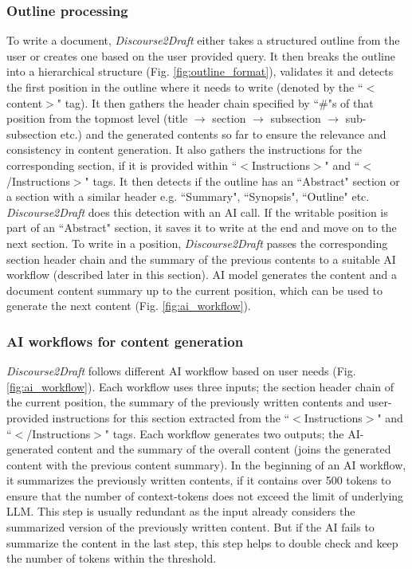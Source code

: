 \documentclass[utf8]{FrontiersinHarvard} %
\newcommand{\appname}{\emph{Discourse2Draft}}
\newcommand{\maxTokensSummarization}{500}
\begin{document}
\subsubsection{Outline processing}
To write a document, \appname{} either takes a structured outline from the user or creates one based on the user provided query. It then breaks the outline into a hierarchical structure (Fig. \ref{fig:outline_format}), validates it and detects the first position in the outline where it needs to write (denoted by the ``$<$content$>$" tag). It then gathers the header chain specified by ``\#"s of that position from the topmost level (title $\rightarrow$ section $\rightarrow$ subsection $\rightarrow$ sub-subsection etc.) and the generated contents so far to ensure the relevance and consistency in content generation. It also gathers the instructions for the corresponding section, if it is provided within ``$<$Instructions$>$" and ``$<$/Instructions$>$" tags. It then detects if the outline has an ``Abstract" section or a section with a similar header e.g. ``Summary", ``Synopsis", ``Outline" etc. \appname{} does this detection with an AI call. If the writable position is part of an ``Abstract" section, it saves it to write at the end and move on to the next section. To write in a position, \appname{} passes the corresponding section header chain and the summary of the previous contents to a suitable AI workflow (described later in this section). AI model generates the content and a document content summary up to the current position, which can be used to generate the next content (Fig. \ref{fig:ai_workflow}).

\subsubsection{AI workflows for content generation}

\appname{} follows different AI workflow based on user needs (Fig. \ref{fig:ai_workflow}). Each workflow uses three inputs; the section header chain of the current position, the summary of the previously written contents and user-provided instructions for this section extracted from the ``$<$Instructions$>$" and ``$<$/Instructions$>$" tags. Each workflow generates two outputs; the AI-generated content and the summary of the overall content (joins the generated content with the previous content summary). In the beginning of an AI workflow, it summarizes the previously written contents, if it contains over \maxTokensSummarization{} tokens to ensure that the number of context-tokens does not exceed the limit of underlying LLM. This step is usually redundant as the input already considers the summarized version of the previously written content. But if the AI fails to summarize the content in the last step, this step helps to double check and keep the number of tokens within the threshold.
\end{document}
